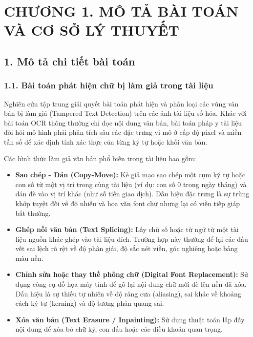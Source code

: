 \section{CHƯƠNG 1. MÔ TẢ BÀI TOÁN VÀ CƠ SỞ LÝ THUYẾT}
\vspace{0.5cm}

\subsection{1. Mô tả chi tiết bài toán}
\subsubsection{1.1. Bài toán phát hiện chữ bị làm giả trong tài liệu}
\indent\indent Nghiên cứu tập trung giải quyết bài toán phát hiện và phân loại các vùng văn bản bị làm giả (Tampered Text Detection) trên các ảnh tài liệu số hóa. Khác với bài toán OCR thông thường chỉ đọc nội dung văn bản, bài toán pháp y tài liệu đòi hỏi mô hình phải phân tích sâu các đặc trưng vi mô ở cấp độ pixel và miền tần số để xác định tính xác thực của từng ký tự hoặc khối văn bản.\vspace{0.3cm}

Các hình thức làm giả văn bản phổ biến trong tài liệu bao gồm:\vspace{-0.1cm}
\begin{itemize}[label={--}, itemsep=1pt]
    \item \textbf{Sao chép - Dán (Copy-Move):} Kẻ giả mạo sao chép một cụm ký tự hoặc con số từ một vị trí trong cùng tài liệu (ví dụ: con số 0 trong ngày tháng) và dán đè vào vị trí khác (như số tiền giao dịch). Dấu hiệu đặc trưng là sự trùng khớp tuyệt đối về độ nhiễu và hoa văn font chữ nhưng lại có viền tiếp giáp bất thường.
    \item \textbf{Ghép nối văn bản (Text Splicing):} Lấy chữ số hoặc từ ngữ từ một tài liệu nguồn khác ghép vào tài liệu đích. Trường hợp này thường để lại các dấu vết sai lệch rõ rệt về độ phân giải, độ sắc nét viền, góc nghiêng hoặc bảng màu nền.
    \item \textbf{Chỉnh sửa hoặc thay thế phông chữ (Digital Font Replacement):} Sử dụng công cụ đồ họa máy tính để gõ lại nội dung chữ mới đè lên nền đã xóa. Dấu hiệu là sự thiếu tự nhiên về độ răng cưa (aliasing), sai khác về khoảng cách ký tự (kerning) và độ tương phản quang sai.
    \item \textbf{Xóa văn bản (Text Erasure / Inpainting):} Sử dụng thuật toán lấp đầy nội dung để xóa bỏ chữ ký, con dấu hoặc các điều khoản quan trọng.
\end{itemize}

